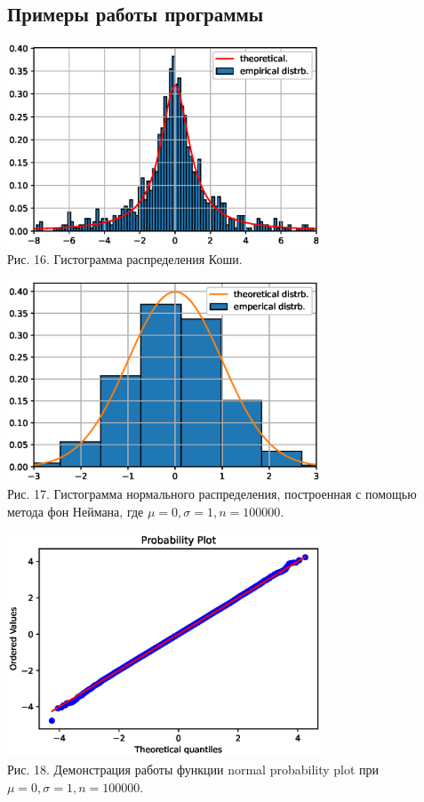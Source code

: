 \documentclass[11pt]{article}
\begin{document}
\subsection{Примеры работы программы}
\begin{center}
	\includegraphics[width=0.7\textwidth]{4_1.eps}\\
	{Рис. 16. Гистограмма распределения Коши. }
\end{center}
\begin{center}
	\includegraphics[width=0.7\textwidth]{4_2.eps}\\
	{Рис. 17. Гистограмма нормального распределения, построенная с помощью метода фон Неймана, где $\mu = 0, \sigma = 1, n = 100000$. }
\end{center}
\begin{center}
	\includegraphics[width=0.7\textwidth]{4_3.eps}\\
	{Рис. 18. Демонстрация работы функции normal probability plot при $\mu = 0, \sigma = 1, n = 100000$. }
\end{center}
\newpage
\end{document}
